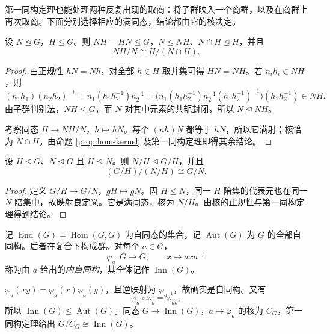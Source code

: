 \documentclass[lang=cn,a4paper,fontset=none,zihao=false,10pt,openany,twoside]{beautybook}
\numberwithin{algorithm}{chapter}
\begin{document}
第一同构定理也能处理两种反复出现的取商：将子群映入一个商群，以及在商群上再次取商。下面分别选择相应的满同态，结论都由它的核决定。
\begin{theorem}[第二同构定理]
设 $N\trianglelefteq G$，$H\le G$。则 $NH=HN\le G$，$N\trianglelefteq NH$、$N\cap H\trianglelefteq H$，并且
\[
 NH/N\cong H/(N\cap H).
\]
\end{theorem}
\begin{proof}
由正规性 $hN=Nh$，对全部 $h\in H$ 取并集可得 $HN=NH$。若 $n_ih_i\in NH$，则
\[
 (n_1h_1)(n_2h_2)^{-1}
 =n_1(h_1h_2^{-1})n_2^{-1}
 =\bigl(n_1(h_1h_2^{-1})n_2^{-1}(h_1h_2^{-1})^{-1}\bigr)(h_1h_2^{-1})\in NH.
\]
由子群判别法，$NH\le G$，而 $N$ 对其中元素的共轭封闭，所以 $N\trianglelefteq NH$。

考察同态 $H\to NH/N$，$h\mapsto hN$。每个 $(nh)N$ 都等于 $hN$，所以它满射；核恰为 $N\cap H$。由命题 \ref{prop:hom-kernel} 及第一同构定理即得其余结论。
\end{proof}
\begin{theorem}[第三同构定理]
设 $H\trianglelefteq G$、$N\trianglelefteq G$ 且 $H\le N$。则 $N/H\trianglelefteq G/H$，并且
\[
 (G/H)/(N/H)\cong G/N.
\]
\end{theorem}
\begin{proof}
定义 $G/H\to G/N$，$gH\mapsto gN$。因 $H\le N$，同一 $H$ 陪集的代表元也在同一 $N$ 陪集中，故映射良定义。它是满同态，核为 $N/H$。由核的正规性与第一同构定理得到结论。
\end{proof}

\begin{definition}
记 $\operatorname{End}(G)=\operatorname{Hom}(G,G)$ 为自同态的集合，记 $\operatorname{Aut}(G)$ 为 $G$ 的全部自同构。后者在复合下构成群。对每个 $a\in G$，
\[
 \varphi_a:G\to G,\qquad x\mapsto axa^{-1}
\]
称为由 $a$ 给出的\emph{内自同构}，其全体记作 $\operatorname{Inn}(G)$。
\end{definition}
$\varphi_a(xy)=\varphi_a(x)\varphi_a(y)$，且逆映射为 $\varphi_{a^{-1}}$，故确实是自同构。又有
\[
 \varphi_a\circ\varphi_b=\varphi_{ab},
\]
所以 $\operatorname{Inn}(G)\le\operatorname{Aut}(G)$。同态 $G\to\operatorname{Inn}(G)$，$a\mapsto\varphi_a$ 的核为 $C_G$，第一同构定理给出 $G/C_G\cong\operatorname{Inn}(G)$。

\end{document}
